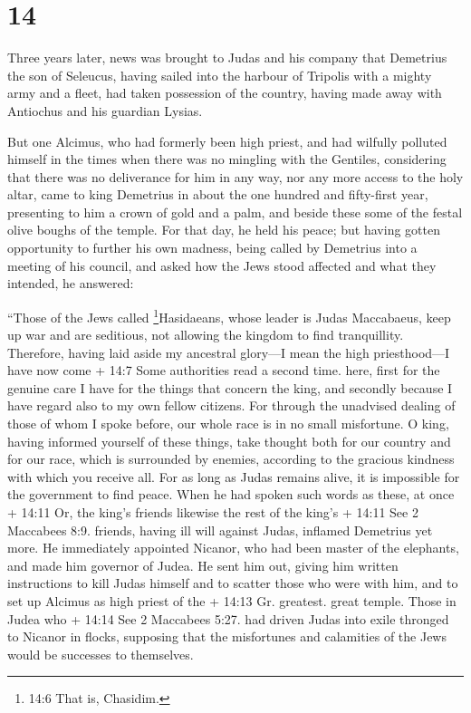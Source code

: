 \hypertarget{section-12}{%
\section{14}\label{section-12}}

 Three years later, news was brought to Judas and his
company that Demetrius the son of Seleucus, having sailed into the
harbour of Tripolis with a mighty army and a fleet,  had
taken possession of the country, having made away with Antiochus and his
guardian Lysias.

 But one Alcimus, who had formerly been high priest, and had
wilfully polluted himself in the times when there was no mingling with
the Gentiles, considering that there was no deliverance for him in any
way, nor any more access to the holy altar,  came to king
Demetrius in about the one hundred and fifty-first year, presenting to
him a crown of gold and a palm, and beside these some of the festal
olive boughs of the temple. For that day, he held his peace;
 but having gotten opportunity to further his own madness,
being called by Demetrius into a meeting of his council, and asked how
the Jews stood affected and what they intended, he answered:

 ``Those of the Jews called \footnote{14:6 That is,
  Chasidim.}Hasidaeans, whose leader is Judas Maccabaeus, keep up war
and are seditious, not allowing the kingdom to find tranquillity.
 Therefore, having laid aside my ancestral glory---I mean
the high priesthood---I have now come + 14:7 Some authorities read a
second time. here,  first for the genuine care I have for
the things that concern the king, and secondly because I have regard
also to my own fellow citizens. For through the unadvised dealing of
those of whom I spoke before, our whole race is in no small misfortune.
 O king, having informed yourself of these things, take
thought both for our country and for our race, which is surrounded by
enemies, according to the gracious kindness with which you receive all.
 For as long as Judas remains alive, it is impossible for
the government to find peace.  When he had spoken such
words as these, at once + 14:11 Or, the king's friends likewise the rest
of the king's + 14:11 See 2 Maccabees 8:9. friends, having ill will
against Judas, inflamed Demetrius yet more.  He immediately
appointed Nicanor, who had been master of the elephants, and made him
governor of Judea. He sent him out,  giving him written
instructions to kill Judas himself and to scatter those who were with
him, and to set up Alcimus as high priest of the + 14:13 Gr. greatest.
great temple.  Those in Judea who + 14:14 See 2 Maccabees
5:27. had driven Judas into exile thronged to Nicanor in flocks,
supposing that the misfortunes and calamities of the Jews would be
successes to themselves.

